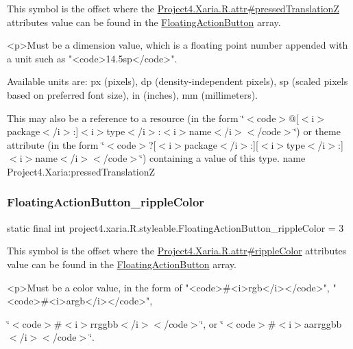 This symbol is the offset where the \hyperlink{}{Project4.\+Xaria.\+R.\+attr\#pressed\+TranslationZ} attribute\textquotesingle{}s value can be found in the \hyperlink{classproject4_1_1xaria_1_1R_1_1styleable_afccbd80ac1ce5fd6f7a9ee0a1b546322}{Floating\+Action\+Button} array.

\begin{DoxyVerb}      <p>Must be a dimension value, which is a floating point number appended with a unit such as "<code>14.5sp</code>".
\end{DoxyVerb}
 Available units are\+: px (pixels), dp (density-\/independent pixels), sp (scaled pixels based on preferred font size), in (inches), mm (millimeters). 

This may also be a reference to a resource (in the form \char`\"{}$<$code$>$@\mbox{[}$<$i$>$package$<$/i$>$\+:\mbox{]}$<$i$>$type$<$/i$>$\+:$<$i$>$name$<$/i$>$$<$/code$>$\char`\"{}) or theme attribute (in the form \char`\"{}$<$code$>$?\mbox{[}$<$i$>$package$<$/i$>$\+:\mbox{]}\mbox{[}$<$i$>$type$<$/i$>$\+:\mbox{]}$<$i$>$name$<$/i$>$$<$/code$>$\char`\"{}) containing a value of this type.  name Project4.\+Xaria\+:pressed\+TranslationZ \mbox{\label{classproject4_1_1xaria_1_1R_1_1styleable_a74c9af162dc277de265d5a2e6fbcbe9e}} 
\subsubsection{\texorpdfstring{Floating\+Action\+Button\+\_\+ripple\+Color}{FloatingActionButton\_rippleColor}}
{\footnotesize\ttfamily static final int project4.\+xaria.\+R.\+styleable.\+Floating\+Action\+Button\+\_\+ripple\+Color = 3\hspace{0.3cm}{\ttfamily [static]}}

This symbol is the offset where the \hyperlink{}{Project4.\+Xaria.\+R.\+attr\#ripple\+Color} attribute\textquotesingle{}s value can be found in the \hyperlink{classproject4_1_1xaria_1_1R_1_1styleable_afccbd80ac1ce5fd6f7a9ee0a1b546322}{Floating\+Action\+Button} array.

\begin{DoxyVerb}      <p>Must be a color value, in the form of "<code>#<i>rgb</i></code>", "<code>#<i>argb</i></code>",
\end{DoxyVerb}
 \char`\"{}$<$code$>$\#$<$i$>$rrggbb$<$/i$>$$<$/code$>$\char`\"{}, or \char`\"{}$<$code$>$\#$<$i$>$aarrggbb$<$/i$>$$<$/code$>$\char`\"{}. 

